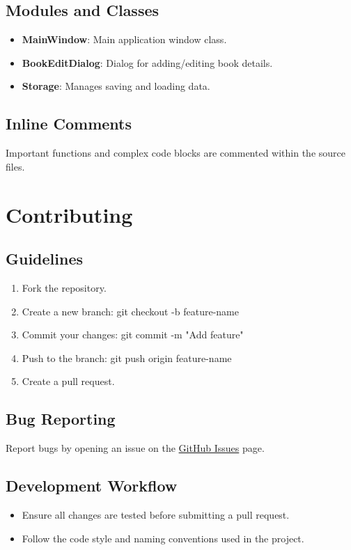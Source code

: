 \documentclass{article}
\begin{document}
\subsection{Modules and Classes}
\begin{itemize}
    \item \textbf{MainWindow}: Main application window class.
    \item \textbf{BookEditDialog}: Dialog for adding/editing book details.
    \item \textbf{Storage}: Manages saving and loading data.
\end{itemize}

\subsection{Inline Comments}
Important functions and complex code blocks are commented within the source files.

\section{Contributing}

\subsection{Guidelines}
\begin{enumerate}
    \item Fork the repository.
    \item Create a new branch:
    git checkout -b feature-name
    \item Commit your changes:
    git commit -m "Add feature"
    \item Push to the branch:
    git push origin feature-name
    \item Create a pull request.
\end{enumerate}

\subsection{Bug Reporting}
Report bugs by opening an issue on the \href{https://github.com/Libra232/BlindChoice/issues}{GitHub Issues} page.

\subsection{Development Workflow}
\begin{itemize}
    \item Ensure all changes are tested before submitting a pull request.
    \item Follow the code style and naming conventions used in the project.
\end{itemize}
\end{document}
